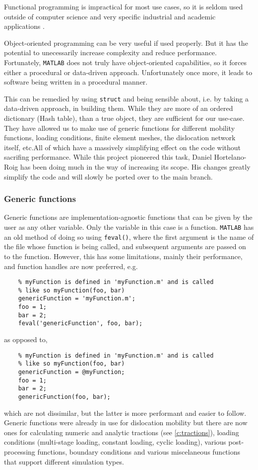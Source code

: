 Functional programming is impractical for most use cases, so it is seldom used outside of computer science and very specific industrial and academic applications \cite{haskell,functionalProg}.

Object-oriented programming can be very useful if used properly. But it has the potential to unecessarily increase complexity and reduce performance. Fortunately, \texttt{MATLAB} does not truly have object-oriented capabilities, so it forces either a procedural or data-driven approach. Unfortunately once more, it leads to software being written in a procedural manner.

This can be remedied by using \texttt{struct} and being sensible about, i.e. by taking a data-driven approach, in building them. While they are more of an ordered dictionary (Hash table), than a true object, they are sufficient for our use-case. They have allowed us to make use of generic functions for different mobility functions, loading conditions, finite element meshes, the dislocation network itself, etc.All of which have a massively simplifying effect on the code without sacrifing performance. While this project pioneered this task, Daniel Hortelano-Roig has been doing much in the way of increasing its scope. His changes greatly simplify the code and will slowly be ported over to the main branch.

\subsubsection{Generic functions}

Generic functions are implementation-agnostic functions that can be given by the user as any other variable. Only the variable in this case is a function. \texttt{MATLAB} has an old method of doing so using \texttt{feval()}, where the first argument is the name of the file whose function is being called, and subsequent arguments are passed on to the function. However, this has some limitations, mainly their performance, and function handles are now preferred, e.g.
\begin{verbatim}
    % myFunction is defined in 'myFunction.m' and is called 
    % like so myFunction(foo, bar)
    genericFunction = 'myFunction.m'; 
    foo = 1;
    bar = 2;
    feval('genericFunction', foo, bar);
\end{verbatim}
as opposed to,
\begin{verbatim}
    % myFunction is defined in 'myFunction.m' and is called 
    % like so myFunction(foo, bar)
    genericFunction = @myFunction; 
    foo = 1;
    bar = 2;
    genericFunction(foo, bar);
\end{verbatim}
which are not dissimilar, but the latter is more performant and easier to follow. Generic functions were already in use for dislocation mobility but there are now ones for calculating numeric and analytic tractions (see \cref{c:tractions}), loading conditions (multi-stage loading, constant loading, cyclic loading), various post-processing functions, boundary conditions and various miscelaneous functions that support different simulation types.

